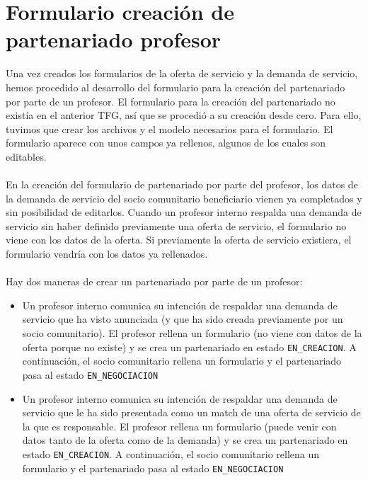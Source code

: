 \documentclass[11pt]{book}
\begin{document}
\section{Formulario creación de partenariado profesor}
Una vez creados los formularios de la oferta de servicio y la demanda de servicio, hemos procedido al desarrollo del formulario para la creación del partenariado por parte de un profesor.
El formulario para la creación del partenariado no existía en el anterior TFG, así que se procedió a su creación desde cero. Para ello, tuvimos que crear los archivos y el modelo necesarios para el formulario. El formulario aparece con unos campos ya rellenos, algunos de los cuales son editables.\\\\
En la creación del formulario de partenariado por parte del profesor, los datos de la demanda de servicio del socio comunitario beneficiario vienen ya completados y sin posibilidad de editarlos. Cuando un profesor interno respalda una demanda de servicio sin haber definido previamente una oferta de servicio, el formulario no viene con los datos de la oferta. Si previamente la oferta de servicio existiera, el formulario vendría con los datos ya rellenados.\\\\ 
Hay dos maneras de crear un partenariado por parte de un profesor:
\begin{itemize}
	\item Un profesor interno comunica su intención de respaldar una
	demanda de servicio que ha visto anunciada (y que ha sido creada
	previamente por un socio comunitario).
	El profesor rellena un formulario (no viene con datos de la oferta
	porque no existe) y se crea un partenariado en estado \texttt{EN\_CREACION}.
	A continuación, el socio comunitario rellena un formulario y el
	partenariado pasa al estado \texttt{EN\_NEGOCIACION}
	\item Un profesor interno comunica su intención de respaldar una
	demanda de servicio que le ha sido presentada como un match de una
	oferta de servicio de la que es responsable. El profesor rellena un formulario (puede venir con datos tanto de la oferta como de la demanda) y se crea un partenariado en estado \texttt{EN\_CREACION}. A continuación, el socio comunitario rellena un formulario y el partenariado pasa al estado \texttt{EN\_NEGOCIACION} \\\\
	
\end{itemize}
\end{document}
